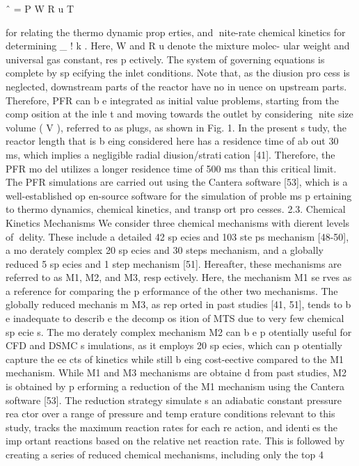 \documentclass[10pt, letterpaper]{article}
\begin{document}
ˆ
=
P
W
R
u
T

for relating the thermo dynamic
prop erties, and nite-rate chemical kinetics for determining \_
!
k
. Here,
W
and
R
u
denote the mixture molec-
ular weight and universal gas constant, res p ectively. The system of governing equations is complete by
sp ecifying the inlet conditions. Note that, as the diusion pro cess is neglected, downstream parts of the
reactor have no in
uence on upstream parts. Therefore, PFR can b e integrated as initial value problems,
starting from the comp osition at the inle t and moving towards the outlet by considering nite size volume
(
V
), referred to as plugs, as shown in Fig. 1.
In the present s tudy, the reactor length that is b eing considered here has a residence time of ab out 30
ms, which implies a negligible radial diusion/stratication [41]. Therefore, the PFR mo del utilizes a longer
residence time of 500 ms than this critical limit. The PFR simulations are carried out using the Cantera
software [53], which is a well-established op en-source software for the simulation of proble ms p ertaining to
thermo dynamics, chemical kinetics, and transp ort pro cesses.
2.3. Chemical Kinetics Mechanisms
We consider three chemical mechanisms with dierent levels of delity. These include a detailed 42
sp ecies and 103 ste ps mechanism [48-50], a mo derately complex 20 sp ecies and 30 steps mechanism, and a
globally reduced 5 sp ecies and 1 step mechanism [51]. Hereafter, these mechanisms are referred to as M1, M2,
and M3, resp ectively. Here, the mechanism M1 se rves as a reference for comparing the p erformance of the
other two mechanisms. The globally reduced mechanis m M3, as rep orted in past studies [41, 51], tends to b e
inadequate to describ e the decomp os ition of MTS due to very few chemical sp ecie s. The mo derately complex
mechanism M2 can b e p otentially useful for CFD and DSMC s imulations, as it employs 20 sp ecies, which
can p otentially capture the ee cts of kinetics while still b eing cost-eective compared to the M1 mechanism.
While M1 and M3 mechanisms are obtaine d from past studies, M2 is obtained by p erforming a reduction of
the M1 mechanism using the Cantera software [53]. The reduction strategy simulate s an adiabatic constant
pressure rea ctor over a range of pressure and temp erature conditions relevant to this study, tracks the
maximum reaction rates for each re action, and identies the imp ortant reactions based on the relative net
reaction rate. This is followed by creating a series of reduced chemical mechanisms, including only the top
4
\end{document}
